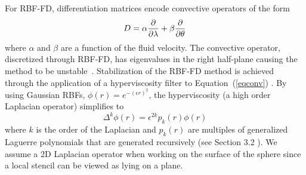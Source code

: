 For RBF-FD, differentiation matrices encode convective operators of the form 
\begin{equation}
D = \alpha \frac{\partial }{\partial \lambda} + \beta \frac{\partial }{\partial \theta} \label{eqconv}
\end{equation}
where $\alpha$ and $\beta$ are a function of the fluid velocity. The convective operator, discretized
through RBF-FD, has eigenvalues 
 in the right half-plane causing the method to be unstable~\cite{FornbergLehto11, FlyerLehto11}. 
Stabilization of the RBF-FD method is achieved through the application of a hyperviscosity filter 
to Equation~(\ref{eqconv}) \cite{FornbergLehto11}. By using Gaussian 
 RBFs, $\phi(r) = e^{-(\epsilon r)^2}$, the hyperviscosity (a high order Laplacian operator) simplifies to
\begin{equation}
\Delta^{k}\phi(r) = \epsilon^{2k} p_k(r) \phi(r)
\label{eqn:gaussian_hv}
\end{equation}
where $k$ is the order of the Laplacian and  $p_k(r)$ are multiples of generalized Laguerre polynomials that
are generated recursively (see Section 3.2 \cite{FornbergLehto11}). We assume a 2D  Laplacian operator 
when working on the surface of the sphere since a local stencil can be viewed as lying on a plane.



